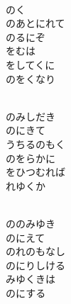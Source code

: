 \documentclass[10pt,b5j]{tarticle} %
\begin{document}
\vspace{1.5em} %
\newcommand{\linespace}{0.5em} %
\newcommand{\blocksize}{0.5\hsize} %
\newcommand{\itemmargin}{6em} %
\begin{enumerate} %
    \setlength{\itemindent}{\itemmargin} %
    \begin{minipage}[c]{\blocksize}
    
        \vspace{\linespace}
        \item~\\
        のく\\
        のあとにれて\\
        のるにぞ\\
        をむは\\
        をしてくに\\
        のをくなり
        
        \vspace{\linespace}
        \item~\\
        のみしだき\\
        のにきて\\
        うちるのもく\\
        のをらかに\\
        をひつむれば\\
        れゆくか
        
        \vspace{\linespace}
        \item~\\
        ののみゆき\\
        のにえて\\
        のれのもなし\\
        のにりしける\\
        みゆくきは\\
        のにする
        

\end{minipage}
\end{enumerate}
\end{document}
